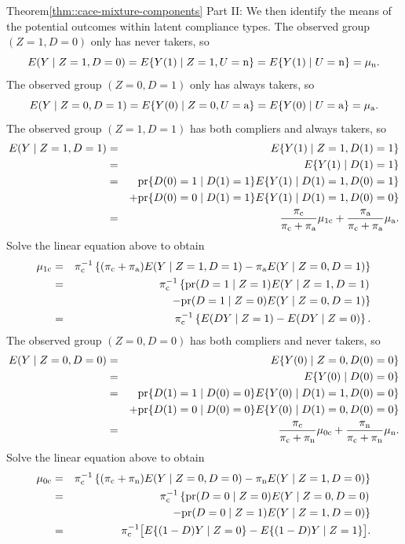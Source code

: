 \begin{myproof}{Theorem}{\ref{thm::cace-mixture-components}}
Part II: We then identify the means of the potential outcomes within latent compliance types. 
The observed group $(Z=1,D=0)$ only has never takers, so 
$$
E(Y\mid Z=1, D=0) = E\{  Y(1) \mid Z=1, U=\textup{n} \} = E\{  Y(1) \mid   U=\textup{n} \}  =
\mu_{\textup{n}}  . 
$$
The observed group $(Z=0,D=1)$ only has always takers, so 
$$
E(Y\mid Z=0, D=1) = E\{  Y(0) \mid Z=0, U=\textup{a} \} = E\{  Y(0) \mid   U=\textup{a} \}  =
\mu_{\textup{a}} . 
$$
The observed group $(Z=1,D=1)$ has both compliers and always takers, so
\begin{eqnarray*}
E(Y\mid Z=1, D=1) &=& E\{ Y(1)\mid Z=1, D(1)=1\} \\
&=& E\{ Y(1)\mid D(1)=1\}  \\   
&=& \textup{pr}\{  D(0)=1 \mid D(1)=1 \} E\{ Y(1)\mid D(1)=1, D(0)=1\}  \\
&&+ \textup{pr}\{  D(0)=0 \mid D(1)=1 \}E\{ Y(1)\mid D(1)=1, D(0)=0\}   \\
&=& \frac{\pi_{\textup{c}}}{\pi_{\textup{c}} + \pi_{\textup{a}}} \mu_{1\textup{c}} +  \frac{\pi_{\textup{a}}}{\pi_{\textup{c}} + \pi_{\textup{a}}} \mu_{\textup{a}}.
\end{eqnarray*}
Solve the linear equation above to obtain
\begin{eqnarray*}
\mu_{1\textup{c}} &=& \pi_{\textup{c}}^{-1} \left\{  (\pi_{\textup{c}} + \pi_{\textup{a}})  E(Y\mid Z=1, D=1)  - \pi_{\textup{a}}    E(Y\mid Z=0, D=1)    \right\} \\
&=& \pi_{\textup{c}}^{-1} \left\{  \textup{pr}(D=1\mid Z=1)  E(Y\mid Z=1, D=1) \right.\\
&&\left. \qquad  -\textup{pr}(D=1\mid Z=0) E(Y\mid Z=0, D=1)    \right\} \\
&=&  \pi_{\textup{c}}^{-1}\left\{   E(DY\mid Z=1 )  -  E(DY\mid Z=0)    \right\}.
\end{eqnarray*}
The observed group $(Z=0,D=0)$ has both compliers and never takers, so 
\begin{eqnarray*}
E(Y\mid Z=0,D=0) &=& E\{ Y(0)\mid Z=0, D(0)=0\} \\
&=& E\{ Y(0)\mid D(0)=0\} \\ 
&=& \textup{pr}\{  D(1)=1 \mid D(0)=0 \} E\{ Y(0)\mid D(1)=1, D(0)=0\}  \\
&&+ \textup{pr}\{  D(1)=0 \mid D(0)= 0\}E\{ Y(0)\mid D(1)=0, D(0)=0\}   \\
&=& \frac{\pi_{\textup{c}}}{\pi_{\textup{c}} + \pi_{\textup{n}}} \mu_{0\textup{c}} +  \frac{\pi_{\textup{n}}}{\pi_{\textup{c}} + \pi_{\textup{n}}} \mu_{\textup{n}}.
\end{eqnarray*}
Solve the linear equation above to obtain 
\begin{eqnarray*}
\mu_{0\textup{c}}  &=& \pi_{\textup{c}}^{-1} \left\{  (\pi_{\textup{c}} + \pi_{\textup{n}})  E(Y\mid Z=0, D=0)  - \pi_{\textup{n}}    E(Y\mid Z=1, D=0)    \right\} \\
&=& \pi_{\textup{c}}^{-1} \left\{ \textup{pr}(D=0\mid Z=0)  E(Y\mid Z=0, D=0)  \right.\\
&&\left. \qquad  -\textup{pr}(D=0\mid Z=1)   E(Y\mid Z=1, D=0)    \right\} \\
&=& \pi_{\textup{c}}^{-1} \big[   E\{ (1-D)Y\mid Z=0 \}  -  E\{(1-D)Y\mid Z=1 \}    \big]. 
\end{eqnarray*}
\end{myproof}

